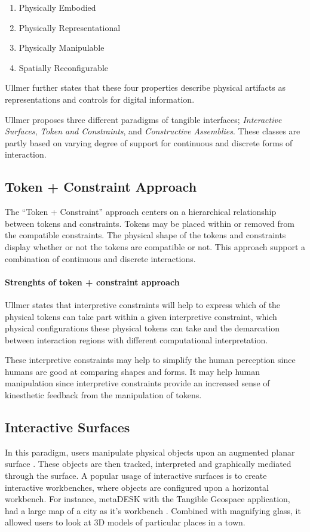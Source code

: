 \begin{enumerate}
	\item{Physically Embodied}
	\item{Physically Representational}
	\item{Physically Manipulable}
	\item{Spatially Reconfigurable}
\end{enumerate}

Ullmer further states that these four properties describe physical artifacts as representations and controls for digital information. 

Ullmer proposes three different paradigms of tangible interfaces; \emph{Interactive Surfaces}, \emph{Token and Constraints}, and \emph{Constructive Assemblies}. These classes are partly based on varying degree of support for continuous and discrete forms of interaction\cite{ullmer2002tangible}.

\subsection{Token + Constraint Approach}
The ``Token + Constraint'' approach centers on a hierarchical relationship between tokens and constraints. Tokens may be placed within or removed from the compatible constraints. The physical shape of the tokens and constraints display whether or not the tokens are compatible or not. This approach support a combination of continuous and discrete interactions. 

\paragraph{Strenghts of token + constraint approach}
Ullmer states that interpretive constraints will help to express which of the physical tokens can take part within a given interpretive constraint, which physical configurations these physical tokens can take and the demarcation between interaction regions with different computational interpretation.

These interpretive constraints may help to simplify the human perception since humans are good at comparing shapes and forms. 
It may help human manipulation since interpretive constraints provide an increased sense of kinesthetic feedback from the manipulation of tokens. 

\subsection{Interactive Surfaces}
In this paradigm, users manipulate physical objects upon an augmented planar surface \cite{ullmer2002tangible}. These objects are then tracked, interpreted and graphically mediated through the surface. A popular usage of interactive surfaces is to create interactive workbenches, where objects are configured upon a horizontal workbench. For instance, metaDESK with the Tangible Geospace application, had a large map of a city as it's workbench \cite{ullmer1997metadesk}. Combined with magnifying glass, it allowed users to look at 3D models of particular places in a town. 



